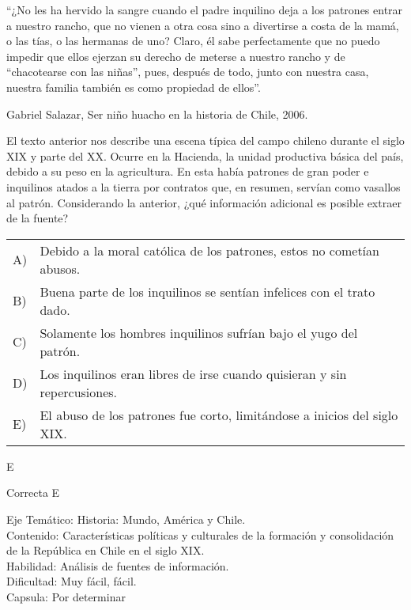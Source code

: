 \documentclass[letterpaper,11pt]{article}
\newcommand{\anchopregunta}{0.9\textwidth}
\begin{document}
\begin{enumerate}
\begin{minipage}{\anchopregunta}
\item ``¿No les ha hervido la sangre cuando el padre inquilino deja a los patrones entrar a nuestro rancho, que no vienen a otra cosa sino a divertirse a costa de la mamá, o las tías, o las hermanas de uno? Claro, él sabe perfectamente que no puedo impedir que ellos ejerzan su derecho de meterse a nuestro rancho y de ``chacotearse con las niñas'', pues, después de todo, junto con nuestra casa, nuestra familia también es como propiedad de ellos''.
\begin{flushright}
Gabriel Salazar, Ser niño huacho en la historia de Chile, 2006.
\end{flushright}
El texto anterior nos describe una escena típica del campo chileno durante el siglo XIX y parte del XX. Ocurre en la Hacienda, la unidad productiva básica del país, debido a su peso en la agricultura. En esta había patrones de gran poder e inquilinos atados a la tierra por contratos que, en resumen, servían como vasallos al patrón. Considerando la anterior, ¿qué información adicional es posible extraer de la fuente?
\begin{flushleft}\begin{tabular}{@{\hspace{-.001\textwidth}}l@{\hspace{2pt}}p{}}
A)& Debido a la moral católica de los patrones, estos no cometían abusos.\\
B)& Buena parte de los inquilinos se sentían infelices con el trato dado.\\
C)& Solamente los hombres inquilinos sufrían bajo el yugo del patrón.\\
D)& Los inquilinos eran libres de irse cuando quisieran y sin repercusiones.\\
E)& El abuso de los patrones fue corto, limitándose a inicios del siglo XIX.\\
\end{tabular}\end{flushleft}%
\begin{key} E
\end{key} 
\begin{hint}
\end{hint}
\begin{answer} Correcta E\\
\end{answer}
\begin{info} %
\begin{flushleft}
Eje Temático: Historia: Mundo, América y Chile.\\
Contenido: Características políticas y culturales de la formación y consolidación de la República en Chile en el siglo XIX.\\
Habilidad: Análisis de fuentes de información.\\
Dificultad: Muy fácil, fácil.\\
Capsula: Por determinar \\
\end{flushleft} 
\end{info}
\end{minipage}\vfill$\;$ %


\end{enumerate}
\end{document}
